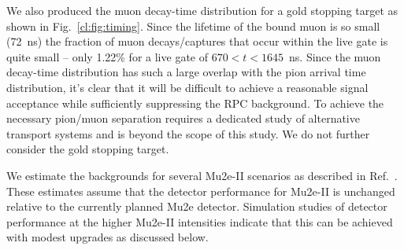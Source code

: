 We also produced the muon decay-time distribution for a gold stopping
target as shown in Fig.~\ref{cl:fig:timing}.  Since the lifetime of
the bound muon is so small (72~ns) the fraction of muon
decays/captures that occur within the live gate is quite small -- only
1.22\% for a live gate of $670 < t < 1645$~ns.  Since the muon
decay-time distribution has such a large overlap with the pion arrival
time distribution, it's clear that it will be difficult to achieve a
reasonable signal acceptance while sufficiently suppressing the RPC
background.  To achieve the necessary pion/muon separation requires a
dedicated study of alternative transport systems and is beyond the
scope of this study. We do not further consider the gold stopping
target.



%

We estimate the backgrounds for several Mu2e-II scenarios as described in Ref.~\cite{Mu2eII}.  These estimates assume that the detector performance for Mu2e-II is unchanged relative to the currently planned Mu2e detector.  Simulation studies of detector performance at the higher Mu2e-II intensities indicate that this can be achieved with modest upgrades as discussed below.



